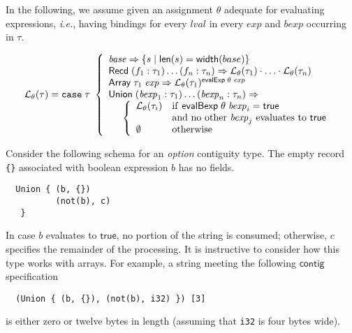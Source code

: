 \documentclass[svgnames]{llncs}
\newcommand{\ie}{\textit{i.e.}}
\newcommand{\konst}[1]{\ensuremath{\mathsf{#1}}}
\newcommand{\set}[1]{\ensuremath{\{ {#1} \}}}
\newcommand{\LangTheta}[1]{\ensuremath{{\mathcal L}_{\theta}({#1})}}
\begin{document}
\begin{definition}

 In the following, we assume given an assignment $\theta$ adequate for
evaluating expressions, \ie, having bindings for every
$\mathit{lval}$ in every $\mathit{exp}$ and $\mathit{bexp}$
occurring in $\tau$.

\[
\LangTheta{\tau} =
\mathtt{case}\; \tau\
 \left\{
 \begin{array}{l}
 \mathit{base} \Rightarrow \set{s \mid \konst{len}(s) = \konst{width}(base)} \\
 \konst{Recd}\; (f_1 : \tau_1) \ldots (f_n : \tau_n)
      \Rightarrow \LangTheta{\tau_1} \cdot \ldots \cdot \LangTheta{\tau_n}
\\
 \konst{Array}\; \tau_1 \; \mathit{exp}
      \Rightarrow  \LangTheta{\tau_1}^{\konst{evalExp}\;\theta\;\mathit{exp}}
\\
 \konst{Union}\; (\mathit{bexp}_1 : \tau_1) \ldots (\mathit{bexp}_n : \tau_n) \Rightarrow \\
  \hspace*{5mm}
 \left\{
 \begin{array}{ll}
    \LangTheta{\tau_i} &  \mathrm{if}\ \konst{evalBexp}\;\theta\;\mathit{bexp}_i = \konst{true} \\
                  & \mathrm{and\ no\ other}\ \mathit{bexp}_j\ \mathrm{evaluates\ to}\ \konst{true}  \\
    \emptyset & \mathrm{otherwise}
 \end{array}
 \right.
 \\
\end{array}
 \right.
\]
\end{definition}

\begin{example}
Consider the following schema for an \emph{option} contiguity
type. The empty record \verb+{}+ associated with boolean expression
$b$ has no fields.

\begin{verbatim}
  Union { (b, {})
          (not(b), c)
   }
\end{verbatim}

\noindent In case $\mathit{b}$ evaluates to \konst{true}, no portion of the
string is consumed; otherwise, $c$ specifies the remainder of the
processing. It is instructive to consider how this type works with
arrays. For example, a string meeting the following \konst{contig} specification

\begin{verbatim}
  (Union { (b, {}), (not(b), i32) }) [3]
\end{verbatim}

\noindent is either zero or twelve bytes in length (assuming that
\verb+i32+ is four bytes wide).

\end{example}
\end{document}

